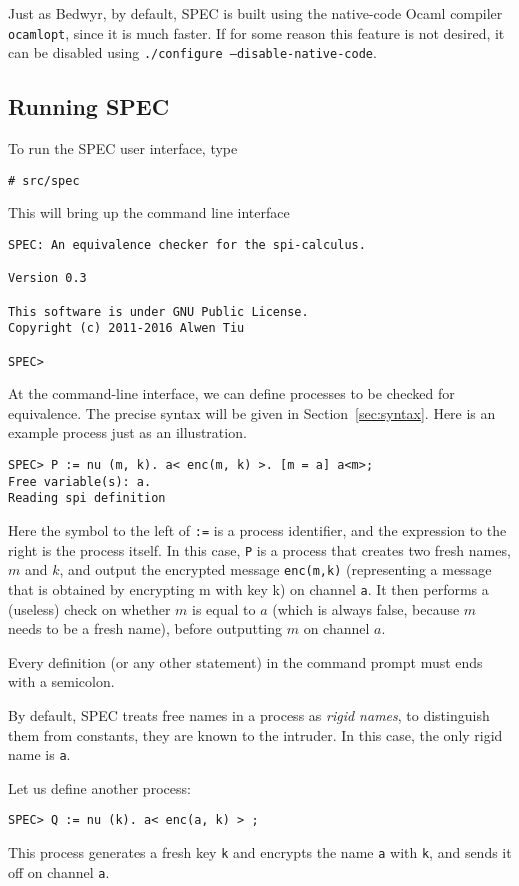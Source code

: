 \documentclass{article}
\begin{document}
Just as Bedwyr, by default, SPEC is built using the native-code Ocaml compiler \texttt{ocamlopt},
since it is much faster. If for some reason this feature is not desired, it can
be disabled using \texttt{./configure --disable-native-code}.

\subsection{Running SPEC}

To run the SPEC user interface, type
\begin{verbatim}
# src/spec
\end{verbatim}
This will bring up the command line interface
\begin{verbatim}
SPEC: An equivalence checker for the spi-calculus. 

Version 0.3

This software is under GNU Public License.
Copyright (c) 2011-2016 Alwen Tiu

SPEC> 

\end{verbatim}
At the command-line interface, we can define processes to be checked for equivalence.
The precise syntax will be given in Section~\ref{sec:syntax}. Here is an example process
just as an illustration. 

\begin{verbatim}
SPEC> P := nu (m, k). a< enc(m, k) >. [m = a] a<m>;
Free variable(s): a.
Reading spi definition
\end{verbatim}
Here the symbol to the left of \texttt{:=} is a process identifier, and 
the expression to the right is the process itself. In this case, \texttt{P}
is a process that creates two fresh names, $m$ and $k$, and output 
the encrypted message \texttt{enc(m,k)} (representing a message that is obtained
by encrypting m with key k) on channel \texttt{a}.
It then performs a (useless) check on whether $m$ is equal to $a$ 
(which is always false, because $m$ needs to be a fresh name), before outputting $m$ on channel $a$. 

Every definition (or any other statement) in the command prompt must ends with a
semicolon.

By default, SPEC treats free names in a process as {\em rigid names}, to distinguish them from constants, they are known
to the intruder. In this case, the only rigid name is \texttt{a}. 

Let us define another process:

\begin{verbatim}
SPEC> Q := nu (k). a< enc(a, k) > ;
\end{verbatim}
This process generates a fresh key \texttt{k} and encrypts the name \texttt{a}
with \texttt{k}, and sends it off on channel \texttt{a}. 
\end{document}
